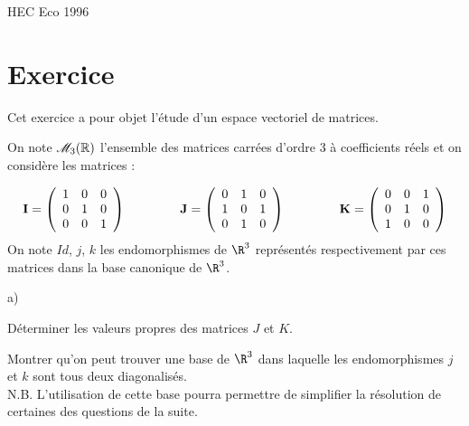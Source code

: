 \documentclass[11pt]{article}%
\begin{document}
\begin{center}
{\huge HEC Eco 1996}
\end{center}
\section{Exercice}

 Cet exercice a pour objet l'étude d'un espace vectoriel de
matrices.\par
 On note $\mathscr{M}_{3}(\mathbb{R})$ l'ensemble des matrices carrées d'ordre 3 à
coefficients réels et on considère les matrices :\par
 \begin{displaymath}
 \mathbf{I} = 
 \left(
\begin{array}{ccc}
	1 & 0 & 0\\
	0 & 1 & 0\\
	0 & 0 & 1\\
\end{array}
\right)
\hspace{1.5cm}
 \mathbf{J} = 
 \left(
\begin{array}{ccc}
	0 & 1 & 0\\
	1 & 0 & 1\\
	0 & 1 & 0\\
\end{array}
\right)
\hspace{1.5cm}
 \mathbf{K} = 
 \left(
\begin{array}{ccc}
	0 & 0 & 1\\
	0 & 1 & 0\\
	1 & 0 & 0\\
\end{array}
\right)
\end{displaymath}
On note $Id$, $j$, $k$ les endomorphismes de $\R^{3}$ représentés
respectivement par ces matrices dans la base canonique de $\R^{3}$.
 \setlength{\itemsep}{4mm}
\item
\begin{noliste}{a)}
 \setlength{\itemsep}{2mm}
\item
Déterminer les valeurs propres des matrices $J$ et $K$.
\item
Montrer qu'on peut trouver une base de $\R^{3}$ dans laquelle les
endomorphismes $j$ et $k$ sont tous deux diagonalisés.
\\
N.B. L'utilisation de cette base pourra permettre de simplifier la
résolution de certaines des questions de la suite.
\end{noliste}
\end{document}
